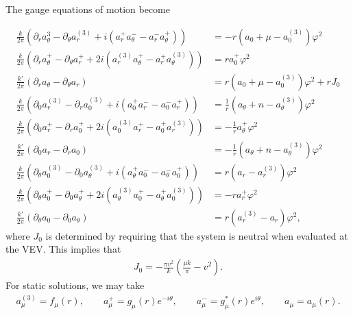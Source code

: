     The gauge equations of motion become

    \begin{align}
        \frac{k}{2 \pi} \left(\partial_{r} a_{\theta}^3 - \partial_{\theta} a_r^{(3)} + i \left(a_r^+ a_{\theta}^- - a_r^- a_{\theta}^{+} \right) \right) &= -r \left( a_0 + \mu - a^{(3)}_0 \right)\varphi^2 \\
        \frac{k}{2 \pi} \left(\partial_r a_{\theta}^{+} - \partial_{\theta} a_r^{+} +2i \left(a_r^{(3)} a_{\theta}^{+} - a_r^{+} a_{\theta}^{(3)} \right) \right) &=r a_0^{+} \varphi^2  \\
        \frac{k'}{2 \pi} \left(\partial_r a_{\theta} - \partial_{\theta} a_r \right) &=r \left(a_0 +\mu - a^{(3)}_0 \right) \varphi^2 + r J_0  \\
        \frac{k}{2 \pi}\left(\partial_{0}a_r^{(3)} - \partial_r a_0^{(3)} + i \left(a_0^+ a_r^- - a_0^- a_r^+  \right)  \right) &= \frac{1}{r} \left(a_{\theta}+n - a_{\theta}^{(3)} \right) \varphi^2  \\
        \frac{k}{2 \pi} \left( \partial_0 a_r^+ - \partial_r a_0^+ + 2i \left( a_0^{(3)} a_r^+ -a_0^+ a_r^{(3)} \right) \right) &= -\frac{1}{r} a_{\theta}^+ \varphi^2  \\
        \frac{k'}{2 \pi} \left( \partial_0 a_r - \partial_r a_0 \right) &= -\frac{1}{r} \left(a_{\theta} +n - a_{\theta}^{(3)} \right) \varphi^2 \\
        \frac{k}{2 \pi} \left(\partial_{\theta} a_0^{(3)} - \partial_0 a_{\theta}^{(3)} + i \left(a_{\theta}^+ a_0^- - a_{\theta}^- a_0^{+} \right) \right) &= r \left(a_r - a_r^{(3)}  \right) \varphi^2 \\
        \frac{k}{2 \pi} \left(\partial_{\theta} a_0^+ - \partial_0 a_{\theta}^+ + 2i \left(a_{\theta}^{(3)} a_0^+ - a_{\theta}^+ a_0^{(3)} \right) \right) &=-r a_r^+ \varphi^2\\
        \frac{k'}{2 \pi} \left(\partial_{\theta}a_0 -\partial_{0} a_{\theta} \right) &= r \left(a_r^{(3)}- a_r \right) \varphi^2,
    \end{align}
    where $J_0$ is determined by requiring that the system is neutral when evaluated at the VEV. This implies that
    \begin{align}
        J_0 = -\frac{\pi v^2}{k} \left(\frac{\mu k}{\pi}- v^2 \right) .
    \end{align}
    For static solutions, we may take
    \begin{align}
        a_{\mu}^{(3)} = f_{\mu}(r), \qquad a_{\mu}^+ = g_{\mu}(r)e^{-i \theta},\qquad a_{\mu}^- = g_{\mu}^*(r) e^{i \theta}, \qquad a_{\mu} = a_{\mu}(r). \label{eq:U2_gauge_ansatz_static}
    \end{align}

